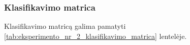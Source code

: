 \subsubsection{Klasifikavimo matrica}
\label{subsubsec:eksperimentas_nr_2_klasifikavimo_matrica}

Klasifikavimo matricą galima pamatyti \ref{tab:eksperimento_nr_2_klasifikavimo_matrica} lentelėje.

